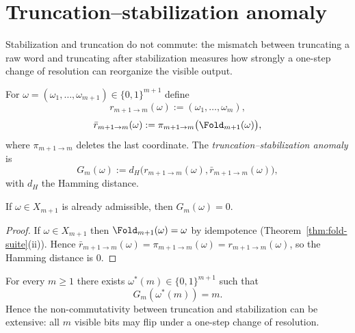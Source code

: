 \section{Truncation--stabilization anomaly}\label{app:gauge}

Stabilization and truncation do not commute: the mismatch between truncating a raw word and truncating after stabilization measures how strongly a one-step change of resolution can reorganize the visible output.

\begin{definition}\label{def:gauge-anomaly}
For $\omega=(\omega_1,\dots,\omega_{m+1})\in\{0,1\}^{m+1}$ define
\[
r_{m+1\to m}(\omega):=(\omega_1,\dots,\omega_m),
\]
\[
\bar r_{m+1\to m}(\omega):=\pi_{m+1\to m}\bigl(\Fold_{m+1}(\omega)\bigr),
\]
where $\pi_{m+1\to m}$ deletes the last coordinate. The \emph{truncation--stabilization anomaly} is
\[
G_m(\omega):=d_H\!\bigl(r_{m+1\to m}(\omega),\bar r_{m+1\to m}(\omega)\bigr),
\]
with $d_H$ the Hamming distance.
\end{definition}

\begin{proposition}\label{prop:gauge-onshell}
If $\omega\in X_{m+1}$ is already admissible, then $G_m(\omega)=0$.
\end{proposition}

\begin{proof}
If $\omega\in X_{m+1}$ then $\Fold_{m+1}(\omega)=\omega$ by idempotence (Theorem~\ref{thm:fold-suite}(ii)). Hence
$\bar r_{m+1\to m}(\omega)=\pi_{m+1\to m}(\omega)=r_{m+1\to m}(\omega)$, so the Hamming distance is $0$.
\end{proof}

\begin{theorem}\label{thm:worst-gauge}
For every $m\ge 1$ there exists $\omega^\ast(m)\in\{0,1\}^{m+1}$ such that
\[
G_m(\omega^\ast(m))=m.
\]
Hence the non-commutativity between truncation and stabilization can be extensive: all $m$ visible bits may flip under a one-step change of resolution.
\end{theorem}

